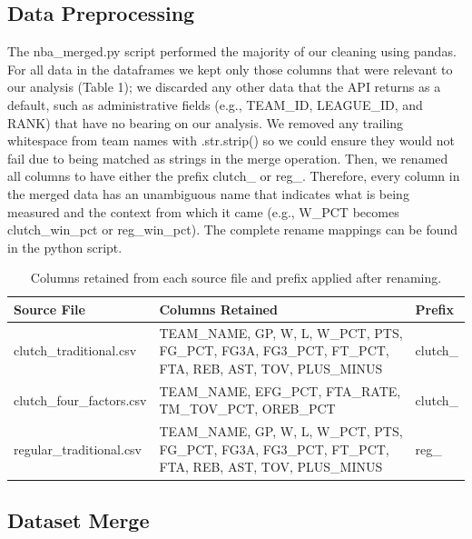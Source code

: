 \subsection{Data Preprocessing}

\begin{sloppypar}
The nba\_merged.py script performed the majority of our cleaning using pandas. For all data in the dataframes we kept only those columns that were relevant to our analysis (Table 1); we discarded any other data that the API returns as a default, such as administrative fields (e.g., TEAM\_ID, LEAGUE\_ID, and RANK) that have no bearing on our analysis. We removed any trailing whitespace from team names with .str.strip() so we could ensure they would not fail due to being matched as strings in the merge operation. Then, we renamed all columns to have either the prefix clutch\_ or reg\_. Therefore, every column in the merged data has an unambiguous name that indicates what is being measured and the context from which it came (e.g., W\_PCT becomes clutch\_win\_pct or reg\_win\_pct). The complete rename mappings can be found in the python script.
\end{sloppypar}

\begin{table}[ht]
    \centering
    \caption{Columns retained from each source file and prefix applied after renaming.}
    \label{tab:columns}
    \renewcommand{\arraystretch}{1.4}
    \small
    \begin{tabular}{@{} l p{8cm} l @{}}
        \toprule
        \textbf{Source File} & \textbf{Columns Retained} & \textbf{Prefix} \\
        \midrule
        clutch\_traditional.csv  &
            TEAM\_NAME, GP, W, L, W\_PCT, PTS, FG\_PCT, FG3A, FG3\_PCT, FT\_PCT, FTA, REB, AST, TOV, PLUS\_MINUS &
            clutch\_ \\[6pt]
        clutch\_four\_factors.csv &
            TEAM\_NAME, EFG\_PCT, FTA\_RATE, TM\_TOV\_PCT, OREB\_PCT &
            clutch\_ \\[6pt]
        regular\_traditional.csv &
            TEAM\_NAME, GP, W, L, W\_PCT, PTS, FG\_PCT, FG3A, FG3\_PCT, FT\_PCT, FTA, REB, AST, TOV, PLUS\_MINUS &
            reg\_ \\
        \bottomrule
    \end{tabular}
\end{table}

\subsection{Dataset Merge}

